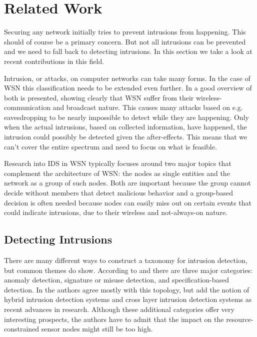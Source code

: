 \documentclass[conference]{IEEEtran}
\begin{document}
\section{Related Work}
\label{section:related}

Securing any network initially tries to prevent intrusions from happening. This
should of course be a primary concern. But not all intrusions can be prevented
and we need to fall back to detecting intrusions. In this section we take a
look at recent contributions in this field.

Intrusion, or attacks, on computer networks can take many forms. In the case of
WSN this classification needs to be extended even further. In
\cite{padmavathi2009survey} a good overview of both is presented, showing
clearly that WSN suffer from their wireless-communication and broadcast nature.
This causes many attacks based on e.g. eavesdropping to be nearly impossible to
detect while they are happening. Only when the actual intrusions, based on
collected information, have happened, the intrusion could possibly be detected
given the after-effects. This means that we can't cover the entire spectrum and
need to focus on what is feasible.

Research into IDS in WSN typically focuses around two major topics that
complement the architecture of WSN: the nodes as single entities and the
network as a group of such nodes. Both are important because the group cannot
decide without members that detect malicious behavior and a group-based
decision is often needed because nodes can easily miss out on certain events
that could indicate intrusions, due to their wireless and not-always-on nature.

\subsection{Detecting Intrusions}
\label{subsection:detecting}

There are many different ways to construct a taxonomy for intrusion detection,
but common themes do show. According to \cite{mishra2004intrusion} and
\cite{ioannis2007towards} there are three major categories: anomaly detection,
signature or misuse detection, and specification-based detection. In
\cite{alrajeh2013intrusion} the authors agree mostly with this topology, but
add the notion of hybrid intrusion detection systems and cross layer intrusion
detection systems as recent advances in research. Although these additional
categories offer very interesting prospects, the authors have to admit that the
impact on the resource-constrained sensor nodes might still be too high.
\end{document}
